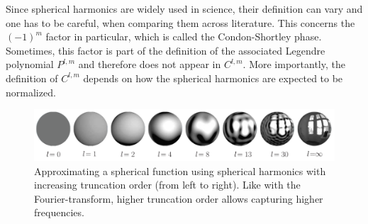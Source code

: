 Since spherical harmonics are widely used in science, their definition can vary and one has to be careful, when comparing them across literature. This concerns the $(-1)^m$ factor in particular, which is called the Condon-Shortley phase. Sometimes, this factor is part of the definition of the associated Legendre polynomial $P^{l,m}$ and therefore does not appear in $C^{l,m}$. More importantly, the definition of $C^{l,m}$ depends on how the spherical harmonics are expected to be normalized.
\newline
\begin{figure}[h]
\centering
\includegraphics[width=\columnwidth]{04_pn_method/figures/fig_sph_frequencies.pdf}
\caption{Approximating a spherical function using spherical harmonics with increasing truncation order (from left to right). Like with the Fourier-transform, higher truncation order allows capturing higher frequencies.}
\label{fig:sh_vis}
\end{figure}



